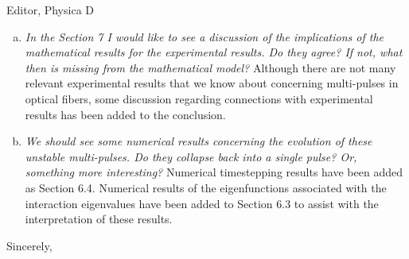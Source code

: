 \documentclass[11pt]{letter}
\begin{document}
\begin{letter}{Editor, Physica D}
\begin{enumerate}[(a)]
\item \emph{In the Section 7 I would like to see a discussion of the implications of the mathematical results for the experimental results. Do they agree? If not, what then is missing from the mathematical model?} Although there are not many relevant experimental results that we know about concerning multi-pulses in optical fibers, some discussion regarding connections with experimental results has been added to the conclusion.
\vspace{4mm}

\item \emph{We should see some numerical results concerning the evolution of these unstable multi-pulses. Do they collapse back into a single pulse? Or, something more interesting?} Numerical timestepping results have been added as Section 6.4. Numerical results of the eigenfunctions associated with the interaction eigenvalues have been added to Section 6.3 to assist with the interpretation of these results.
\vspace{4mm}

\end{enumerate}

\closing{Sincerely,}

\end{letter}
\end{document}
